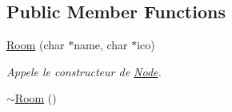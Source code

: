\subsection*{Public Member Functions}
\begin{DoxyCompactItemize}
\item 
\hyperlink{class_e_p_1_1_room_aefc0919f87a1f6dcfde24923719e6b90}{Room} (char $\ast$name, char $\ast$ico)\hypertarget{class_e_p_1_1_room_aefc0919f87a1f6dcfde24923719e6b90}{}\label{class_e_p_1_1_room_aefc0919f87a1f6dcfde24923719e6b90}

\begin{DoxyCompactList}\small\item\em Appele le constructeur de \hyperlink{class_e_p_1_1_node}{Node}. \end{DoxyCompactList}\item 
\hyperlink{class_e_p_1_1_room_a1dba2dc4fdec31c930b5f538bb4018cf}{$\sim$\+Room} ()\hypertarget{class_e_p_1_1_room_a1dba2dc4fdec31c930b5f538bb4018cf}{}\label{class_e_p_1_1_room_a1dba2dc4fdec31c930b5f538bb4018cf}


\end{DoxyCompactItemize}
